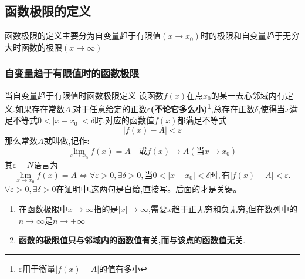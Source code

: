 \documentclass[10pt, a4paper, oneside, UTF8]{ctexbook}
\begin{document}
\begin{sloppypar}
    \subsection{函数极限的定义}
    函数极限的定义主要分为自变量趋于有限值$(x \to x_0)$时的极限和自变量趋于无穷大时函数的极限$(x \to \infty)$
    \subsubsection{自变量趋于有限值时的函数极限}
    \begin{defn}{当自变量趋于有限值时函数极限定义}{}
        设函数$f(x)$在点$x_0$的某一去心邻域内有定义.如果存在常数$A$,对于任意给定的正数$\varepsilon$\textbf{(不论它多么小)\footnote{$\varepsilon$用于衡量$|f(x)-A|$的值有多小}},总存在正数$\delta$,使得当$x$满足不等式$0<|x-x_0|<\delta$时,对应的函数值$f(x)$都满足不等式
        $$
            |f(x)-A|<\varepsilon
        $$
        那么常数$A$就叫做,记作:
        $$
            \lim_{x\to x_0}f(x)=A\quad\text{或}f(x)\to A(\text{当}x\to x_0)
        $$
        其$\varepsilon-N$语言为
        $$
            \lim_{x\to x_0}f(x)=A\Leftrightarrow\forall\varepsilon>0,\exists\delta>0,\text{当}0<|x-x_0|<\delta\text{时},\text{有}|f(x)-A|<\varepsilon.
        $$
        $\forall\varepsilon>0,\exists\delta>0$在证明中,这两句是白给,直接写。后面的才是关键。
    \end{defn}
    \begin{criterion}{}{}
        \begin{enumerate}
            \item 在函数极限中$x \to \infty$指的是$|x| \to \infty$,需要$x$趋于正无穷和负无穷,但在数列中的$n \to \infty$是$n \to +\infty$
            \item \textbf{函数的极限值只与邻域内的函数值有关,而与该点的函数值无关}.
        \end{enumerate}
    \end{criterion}

\end{sloppypar}
\end{document}
